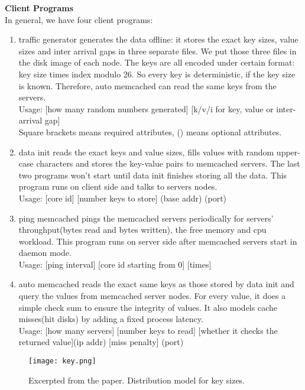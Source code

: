 \documentclass[11pt]{article}
\begin{document}
{\bf Client Programs}\\

In general, we have four client programs:
\begin{enumerate}
	\item
		traffic generator generates the data offline: it stores the exact key sizes, value sizes and inter arrival gaps in three separate files. 
		We put those three files in the disk image of each node. 
		The keys are all encoded under certain format: key size times index modulo 26. So every key is deterministic, if the key size is known. 
		Therefore, auto memcached can read the same keys from the servers. \\
		Usage: [how many random numbers generated] [k/v/i for key, value or inter-arrival gap] \\
		Square brackets means required attributes, () means optional attributes. 
	\item
		data init reads the exact keys and value sizes, fills values with random upper-case characters and stores the key-value pairs to memcached servers. The last two programs won't start until data init finishes storing all the data. This program runs on client side and talks to servers nodes. \\
		Usage: [core id] [number keys to store] (base addr) (port)
		
	\item
		ping memcached pings the memcached servers periodically for servers' throughput(bytes read and bytes written), the free memory and cpu workload. This program runs on server side after memcached servers start in daemon mode. \\
		Usage: [ping interval] [core id starting from 0] [times]
	\item
		auto memcached reads the exact same keys as those stored by data init and query the values from memcached server nodes. For every value, it does a simple check sum to ensure the integrity of values. It also models cache misses(hit disks) by adding a fixed process latency. \\
		Usage: [how many servers] [number keys to read] [whether it checks the returned value](ip addr) [miss penalty] (port)
		
\end{enumerate}

\newpage

\begin{figure}
\begin{center}
\texttt{[image: key.png]}
\caption{Excerpted from the paper. Distribution model for key sizes.}
\end{center}
\end{figure}
	
\end{document}
